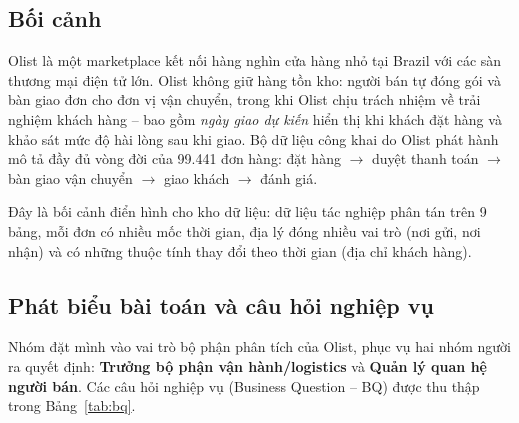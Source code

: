 \documentclass[a4paper]{article}
\begin{document}
\subsection{Bối cảnh}
Olist là một marketplace kết nối hàng nghìn cửa hàng nhỏ tại Brazil với các sàn thương mại điện tử lớn. Olist không giữ hàng tồn kho: người bán tự đóng gói và bàn giao đơn cho đơn vị vận chuyển, trong khi Olist chịu trách nhiệm về trải nghiệm khách hàng -- bao gồm \textit{ngày giao dự kiến} hiển thị khi khách đặt hàng và khảo sát mức độ hài lòng sau khi giao. Bộ dữ liệu công khai do Olist phát hành~\cite{olist2018} mô tả đầy đủ vòng đời của 99.441 đơn hàng: đặt hàng $\rightarrow$ duyệt thanh toán $\rightarrow$ bàn giao vận chuyển $\rightarrow$ giao khách $\rightarrow$ đánh giá.

Đây là bối cảnh điển hình cho kho dữ liệu: dữ liệu tác nghiệp phân tán trên 9 bảng, mỗi đơn có nhiều mốc thời gian, địa lý đóng nhiều vai trò (nơi gửi, nơi nhận) và có những thuộc tính thay đổi theo thời gian (địa chỉ khách hàng).

\subsection{Phát biểu bài toán và câu hỏi nghiệp vụ}
Nhóm đặt mình vào vai trò bộ phận phân tích của Olist, phục vụ hai nhóm người ra quyết định: \textbf{Trưởng bộ phận vận hành/logistics} và \textbf{Quản lý quan hệ người bán}. Các câu hỏi nghiệp vụ (Business Question -- BQ) được thu thập trong Bảng~\ref{tab:bq}.
\end{document}
